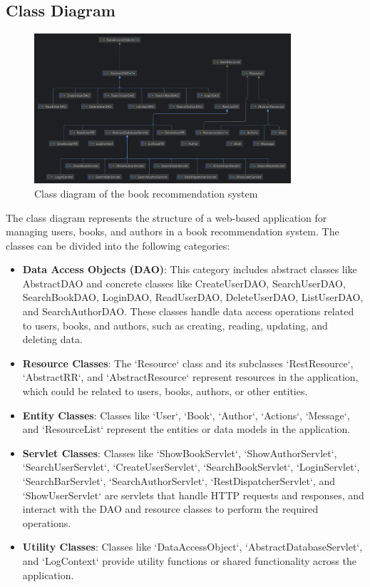 \subsection{Class Diagram}

\begin{figure}[!ht]
\centering
\includegraphics[width=0.85\textwidth]{sections/Class_diagram.png}
\caption{Class diagram of the book recommendation system}
\end{figure}

The class diagram represents the structure of a web-based application for managing users, books, and authors in a book recommendation system. The classes can be divided into the following categories:
\begin{itemize}
\item \textbf{Data Access Objects (DAO)}: This category includes abstract classes like AbstractDAO and concrete classes like CreateUserDAO, SearchUserDAO, SearchBookDAO, LoginDAO, ReadUserDAO, DeleteUserDAO, ListUserDAO, and SearchAuthorDAO. These classes handle data access operations related to users, books, and authors, such as creating, reading, updating, and deleting data.
\item \textbf{Resource Classes}: The `Resource` class and its subclasses `RestResource`, `AbstractRR`, and `AbstractResource` represent resources in the application, which could be related to users, books, authors, or other entities.

\item \textbf{Entity Classes}: Classes like `User`, `Book`, `Author`, `Actions`, `Message`, and `ResourceList` represent the entities or data models in the application.

\item \textbf{Servlet Classes}: Classes like `ShowBookServlet`, `ShowAuthorServlet`, `SearchUserServlet`, `CreateUserServlet`, `SearchBookServlet`, `LoginServlet`, `SearchBarServlet`, `SearchAuthorServlet`, `RestDispatcherServlet`, and `ShowUserServlet` are servlets that handle HTTP requests and responses, and interact with the DAO and resource classes to perform the required operations.

\item \textbf{Utility Classes}: Classes like `DataAccessObject`, `AbstractDatabaseServlet`, and `LogContext` provide utility functions or shared functionality across the application.
\end{itemize}

